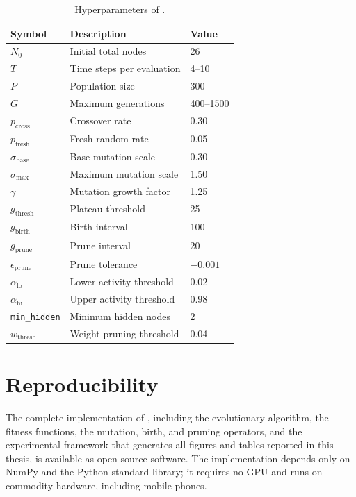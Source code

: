 \begin{table}[h]
  \centering
  \small
  \caption{Hyperparameters of \modnet{}.}
  \label{tab:method-hyperparameters}
  \begin{tabular}{lll}
    \toprule
    \textbf{Symbol} & \textbf{Description} & \textbf{Value} \\
    \midrule
    $N_0$ & Initial total nodes & 26 \\
    $T$ & Time steps per evaluation & 4--10 \\
    $P$ & Population size & 300 \\
    $G$ & Maximum generations & 400--1500 \\
    $p_{\text{cross}}$ & Crossover rate & 0.30 \\
    $p_{\text{fresh}}$ & Fresh random rate & 0.05 \\
    $\sigma_{\text{base}}$ & Base mutation scale & 0.30 \\
    $\sigma_{\max}$ & Maximum mutation scale & 1.50 \\
    $\gamma$ & Mutation growth factor & 1.25 \\
    $g_{\text{thresh}}$ & Plateau threshold & 25 \\
    $g_{\text{birth}}$ & Birth interval & 100 \\
    $g_{\text{prune}}$ & Prune interval & 20 \\
    $\epsilon_{\text{prune}}$ & Prune tolerance & $-0.001$ \\
    $\alpha_{\text{lo}}$ & Lower activity threshold & 0.02 \\
    $\alpha_{\text{hi}}$ & Upper activity threshold & 0.98 \\
    \texttt{min\_hidden} & Minimum hidden nodes & 2 \\
    $w_{\text{thresh}}$ & Weight pruning threshold & 0.04 \\
    \bottomrule
  \end{tabular}
\end{table}

\section{Reproducibility}
\label{sec:method-reproducibility}

The complete implementation of \modnet{}, including the evolutionary
algorithm, the fitness functions, the mutation, birth, and pruning
operators, and the experimental framework that generates all figures
and tables reported in this thesis, is available as open-source
software. The implementation depends only on NumPy and the Python
standard library; it requires no GPU and runs on commodity hardware,
including mobile phones.

